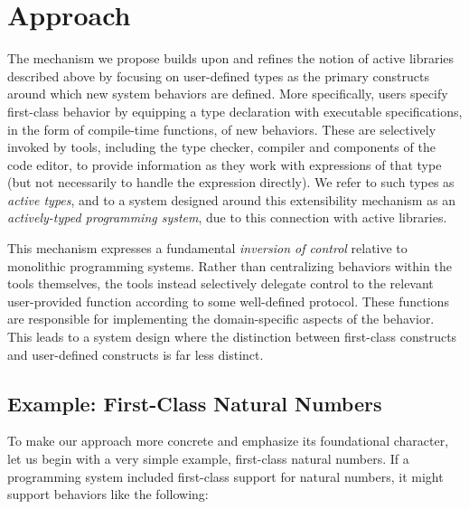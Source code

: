 \newcommand{\nat}{\textbf{nat}}
\newcommand{\natz}{\textbf{z}}
\newcommand{\nats}[1]{\textbf{s}(#1)}
\newcommand{\natrec}[3]{\textbf{natrec}(#1, #2, #3)}
\renewcommand{\ttdefault}{txtt}

\section{Approach}
The mechanism we propose builds upon and refines the notion of active libraries described above  by focusing on user-defined types as the primary constructs around which new system behaviors are defined. More specifically, users specify first-class behavior by equipping a type declaration with executable specifications, in the form of compile-time functions, of new behaviors. These are selectively invoked by tools, including the type checker, compiler and components of the code editor, to provide information as they work with expressions of that type (but not necessarily to handle the expression directly). We refer to such types as \emph{active types}, and to a system designed around this extensibility mechanism as an \emph{actively-typed programming system}, due to this connection with active libraries.

This mechanism expresses a fundamental \emph{inversion of control} relative to monolithic programming systems. Rather than centralizing behaviors within the tools themselves, the tools instead selectively delegate control to the relevant user-provided function according to some well-defined protocol. These functions are responsible for implementing the domain-specific aspects of the behavior. This leads to a system design where the distinction between first-class constructs and user-defined constructs is far less distinct. 

\subsection{Example: First-Class Natural Numbers}
To make our approach more concrete and emphasize its foundational character, let us begin with a very simple example, first-class natural numbers. If a programming system included first-class support for natural numbers, it might support behaviors like the following:

